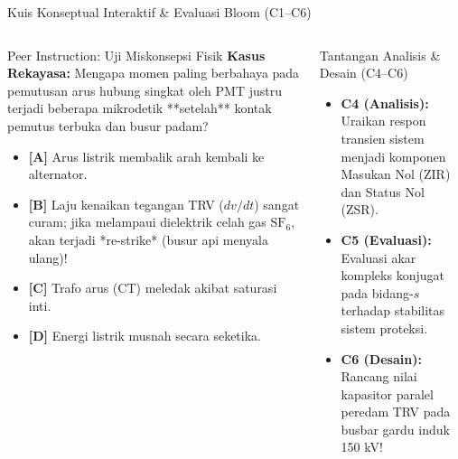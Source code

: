 \documentclass[aspectratio=169,10pt]{beamer}
\begin{document}
\begin{frame}{Kuis Konseptual Interaktif \& Evaluasi Bloom (C1--C6)}
  \begin{columns}[t]
    \begin{alertblock}{Peer Instruction: Uji Miskonsepsi Fisik}
      \footnotesize
      \textbf{Kasus Rekayasa:} Mengapa momen paling berbahaya pada pemutusan arus hubung singkat oleh PMT justru terjadi beberapa mikrodetik **setelah** kontak pemutus terbuka dan busur padam?
      \vspace{0.05cm}
      \begin{itemize}\setlength{\itemsep}{1pt}
        \item \textbf{[A]} Arus listrik membalik arah kembali ke alternator.
        \item \textbf{[B]} Laju kenaikan tegangan TRV ($dv/dt$) sangat curam; jika melampaui dielektrik celah gas $\text{SF}_6$, akan terjadi *re-strike* (busur api menyala ulang)!
        \item \textbf{[C]} Trafo arus (CT) meledak akibat saturasi inti.
        \item \textbf{[D]} Energi listrik musnah secara seketika.
      \end{itemize}
    \end{alertblock}

    \begin{block}{Tantangan Analisis \& Desain (C4--C6)}
      \footnotesize
      \begin{itemize}\setlength{\itemsep}{2pt}
        \item \textbf{C4 (Analisis):} Uraikan respon transien sistem menjadi komponen Masukan Nol (ZIR) dan Status Nol (ZSR).
        \item \textbf{C5 (Evaluasi):} Evaluasi akar kompleks konjugat pada bidang-$s$ terhadap stabilitas sistem proteksi.
        \item \textbf{C6 (Desain):} Rancang nilai kapasitor paralel peredam TRV pada busbar gardu induk 150 kV!
      \end{itemize}
    \end{block}
  \end{columns}
\end{frame}
\end{document}

